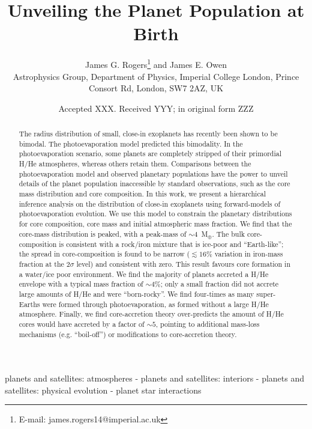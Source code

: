 \documentclass[fleqn,usenatbib]{mnras}
\title[Unveiling the Planet Population at Birth]{Unveiling the Planet Population at Birth}
\author[Rogers, J. G. \& Owen, J. E.]{
James G. Rogers\thanks{E-mail: james.rogers14@imperial.ac.uk} and James E. Owen
\\
Astrophysics Group, Department of Physics, Imperial College London, Prince Consort Rd, London, SW7 2AZ, UK\\
}
\date{Accepted XXX. Received YYY; in original form ZZZ}
\begin{document}
\label{firstpage}
\pagerange{\pageref{firstpage}--\pageref{lastpage}}
\maketitle

\begin{abstract}
The radius distribution of small, close-in exoplanets has recently been shown to be bimodal. The photoevaporation model predicted this bimodality. In the photoevaporation scenario, some planets are completely stripped of their primordial H/He atmospheres, whereas others retain them. Comparisons between the photoevaporation model and observed planetary populations have the power to unveil details of the planet population inaccessible by standard observations, such as the core mass distribution and core composition.  In this work, we present a hierarchical inference analysis on the distribution of close-in exoplanets using forward-models of photoevaporation evolution. We use this model to constrain the planetary distributions for core composition, core mass and initial atmospheric mass fraction. We find that the core-mass distribution is peaked, with a peak-mass of $\sim 4$~M$_\oplus$. The bulk core-composition is consistent with a rock/iron mixture that is ice-poor and ``Earth-like''; the spread in core-composition is found to be narrow ($\lesssim 16\%$ variation in iron-mass fraction at the 2$\sigma$ level) and consistent with zero. This result favours core formation in a water/ice poor environment. We find the majority of planets accreted a H/He envelope with a typical mass fraction of $\sim 4\%$; only a small fraction did not accrete large amounts of H/He and were ``born-rocky''. We find four-times as many super-Earths were formed through photoevaporation, as formed without a large H/He atmosphere. Finally, we find core-accretion theory over-predicts the amount of H/He cores would have accreted by a factor of $\sim 5$, pointing to additional mass-loss mechanisms (e.g. ``boil-off'') or modifications to core-accretion theory. 
\end{abstract}

\begin{keywords}
planets and satellites: atmospheres - planets and satellites: interiors -
planets and satellites: physical evolution - planet star interactions
\end{keywords}
\end{document}
